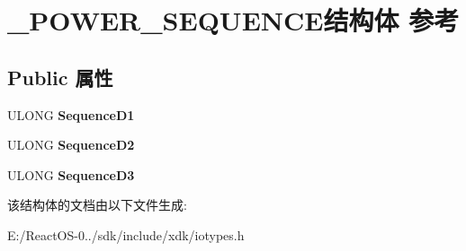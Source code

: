 \hypertarget{struct___p_o_w_e_r___s_e_q_u_e_n_c_e}{}\section{\+\_\+\+P\+O\+W\+E\+R\+\_\+\+S\+E\+Q\+U\+E\+N\+C\+E结构体 参考}
\label{struct___p_o_w_e_r___s_e_q_u_e_n_c_e}
\subsection*{Public 属性}
\begin{DoxyCompactItemize}
\item 
\mbox{\label{struct___p_o_w_e_r___s_e_q_u_e_n_c_e_aadf4f1b8aae42bd67ba02bac10fb136a}} 
U\+L\+O\+NG {\bfseries Sequence\+D1}
\item 
\mbox{\label{struct___p_o_w_e_r___s_e_q_u_e_n_c_e_a14fe0f711af57a28608641c44d6bf3b1}} 
U\+L\+O\+NG {\bfseries Sequence\+D2}
\item 
\mbox{\label{struct___p_o_w_e_r___s_e_q_u_e_n_c_e_add7b16ef36166f7cbab3535e962ab104}} 
U\+L\+O\+NG {\bfseries Sequence\+D3}
\end{DoxyCompactItemize}


该结构体的文档由以下文件生成\+:\begin{DoxyCompactItemize}
\item 
E\+:/\+React\+O\+S-\/0../sdk/include/xdk/iotypes.\+h\end{DoxyCompactItemize}
